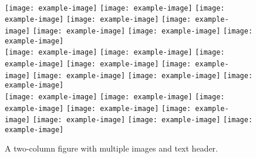 \begin{figure*}[t] \centering
    \\
    \texttt{[image: example-image]}
    \texttt{[image: example-image]}
    \texttt{[image: example-image]}
    \texttt{[image: example-image]}
    \texttt{[image: example-image]}
    \texttt{[image: example-image]}
    \texttt{[image: example-image]}
    \texttt{[image: example-image]}
    \\
    \texttt{[image: example-image]}
    \texttt{[image: example-image]}
    \texttt{[image: example-image]}
    \texttt{[image: example-image]}
    \texttt{[image: example-image]}
    \texttt{[image: example-image]}
    \texttt{[image: example-image]}
    \texttt{[image: example-image]}
    \\
    \texttt{[image: example-image]}
    \texttt{[image: example-image]}
    \texttt{[image: example-image]}
    \texttt{[image: example-image]}
    \texttt{[image: example-image]}
    \texttt{[image: example-image]}
    \texttt{[image: example-image]}
    \texttt{[image: example-image]}
    \\
    \caption{A two-column figure with multiple images and text header.} 
    \label{fig:figure8}
\end{figure*}
